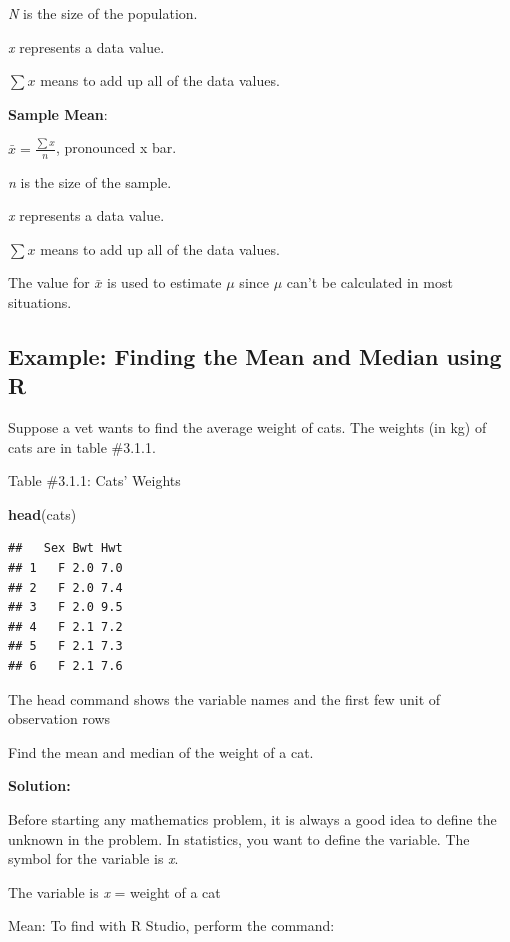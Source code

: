 \documentclass[
]{book}
\newenvironment{Shaded}{\begin{snugshade}}{\end{snugshade}}
\newcommand{\KeywordTok}[1]{\textcolor[rgb]{0.13,0.29,0.53}{\textbf{#1}}}
\newcommand{\NormalTok}[1]{#1}
\begin{document}
\emph{N} is the size of the population.

\emph{x} represents a data value.

\(\sum{x}\) means to add up all of the data values.

\textbf{Sample Mean}:

\(\bar{x}=\frac{\sum{x}}{n}\), pronounced x bar.

\emph{n} is the size of the sample.

\emph{x} represents a data value.

\(\sum{x}\) means to add up all of the data values.

The value for \(\bar{x}\) is used to estimate \(\mu\) since \(\mu\) can't be calculated in most situations.

\hypertarget{example-finding-the-mean-and-median-using-r}{%
\subsection{Example: Finding the Mean and Median using R}\label{example-finding-the-mean-and-median-using-r}}

Suppose a vet wants to find the average weight of cats. The weights (in kg) of cats are in table \#3.1.1.

Table \#3.1.1: Cats' Weights

\begin{Shaded}
\begin{Highlighting}[]
\KeywordTok{head}\NormalTok{(cats) }
\end{Highlighting}
\end{Shaded}

\begin{verbatim}
##   Sex Bwt Hwt
## 1   F 2.0 7.0
## 2   F 2.0 7.4
## 3   F 2.0 9.5
## 4   F 2.1 7.2
## 5   F 2.1 7.3
## 6   F 2.1 7.6
\end{verbatim}

The head command shows the variable names and the first few unit of observation rows

Find the mean and median of the weight of a cat.

\textbf{Solution:}

Before starting any mathematics problem, it is always a good idea to define the unknown in the problem. In statistics, you want to define the variable. The symbol for the variable is \emph{x}.

The variable is \emph{x} = weight of a cat

Mean:
To find with R Studio, perform the command:
\end{document}
